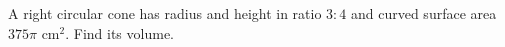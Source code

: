 A right circular cone has radius and height in ratio $3:4$ and curved surface area $375\pi\text{ cm}^2$. Find its volume.
